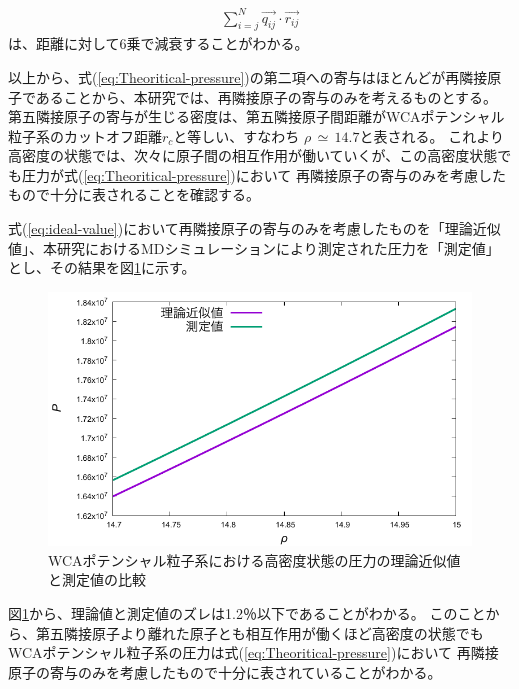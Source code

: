\documentclass[titlepage]{jsreport}
\begin{document}
{{{\large
\begin{eqnarray}
    \sum_{i=j}^N\vec{q_{ij}} \cdot \vec{r_{ij}} \nonumber
\end{eqnarray}
\normalsize
は、距離に対して6乗で減衰することがわかる。

以上から、式(\ref{eq:Theoritical-pressure})の第二項への寄与はほとんどが再隣接原子であることから、本研究では、再隣接原子の寄与のみを考えるものとする。
第五隣接原子の寄与が生じる密度は、第五隣接原子間距離がWCAポテンシャル粒子系のカットオフ距離$r_c$と等しい、すなわち
$\rho\,{\simeq}\,14.7$と表される。
これより高密度の状態では、次々に原子間の相互作用が働いていくが、この高密度状態でも圧力が式(\ref{eq:Theoritical-pressure})において
再隣接原子の寄与のみを考慮したもので十分に表されることを確認する。

式(\ref{eq:ideal-value})において再隣接原子の寄与のみを考慮したものを「理論近似値」、本研究におけるMDシミュレーションにより測定された圧力を「測定値」とし、その結果を図\ref{fig:highden_compare:den-pre}に示す。

\begin{figure}[htbp]
    \begin{center}
        \includegraphics[width=14cm]{fig/highden_compare:den-pre.pdf}
    \end{center}
    \caption{WCAポテンシャル粒子系における高密度状態の圧力の理論近似値と測定値の比較}
    \label{fig:highden_compare:den-pre}
\end{figure}


図\ref{fig:highden_compare:den-pre}から、理論値と測定値のズレは1.2％以下であることがわかる。
このことから、第五隣接原子より離れた原子とも相互作用が働くほど高密度の状態でもWCAポテンシャル粒子系の圧力は式(\ref{eq:Theoritical-pressure})において
再隣接原子の寄与のみを考慮したもので十分に表されていることがわかる。

}}}
\end{document}
